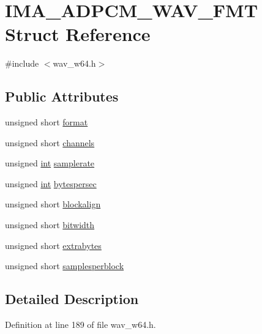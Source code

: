 \hypertarget{struct_i_m_a___a_d_p_c_m___w_a_v___f_m_t}{}\section{I\+M\+A\+\_\+\+A\+D\+P\+C\+M\+\_\+\+W\+A\+V\+\_\+\+F\+MT Struct Reference}
\label{struct_i_m_a___a_d_p_c_m___w_a_v___f_m_t}


{\ttfamily \#include $<$wav\+\_\+w64.\+h$>$}

\subsection*{Public Attributes}
\begin{DoxyCompactItemize}
\item 
unsigned short \hyperlink{struct_i_m_a___a_d_p_c_m___w_a_v___f_m_t_aa33b040c885f3c536a1dd34a5917cb38}{format}
\item 
unsigned short \hyperlink{struct_i_m_a___a_d_p_c_m___w_a_v___f_m_t_a302decd1d4bb70e338bfef02e4a65845}{channels}
\item 
unsigned \hyperlink{xmltok_8h_a5a0d4a5641ce434f1d23533f2b2e6653}{int} \hyperlink{struct_i_m_a___a_d_p_c_m___w_a_v___f_m_t_a65cfee0844b5d6a9db8b479eeb32e649}{samplerate}
\item 
unsigned \hyperlink{xmltok_8h_a5a0d4a5641ce434f1d23533f2b2e6653}{int} \hyperlink{struct_i_m_a___a_d_p_c_m___w_a_v___f_m_t_a2a14a06ba191178dfc4f69c7568ae2a6}{bytespersec}
\item 
unsigned short \hyperlink{struct_i_m_a___a_d_p_c_m___w_a_v___f_m_t_a6825977def909303f455591eba87accc}{blockalign}
\item 
unsigned short \hyperlink{struct_i_m_a___a_d_p_c_m___w_a_v___f_m_t_ad72c9fb895e367087e0361d8d7f246b8}{bitwidth}
\item 
unsigned short \hyperlink{struct_i_m_a___a_d_p_c_m___w_a_v___f_m_t_a155eb8cdf1fb8e65d693fcdfa011861e}{extrabytes}
\item 
unsigned short \hyperlink{struct_i_m_a___a_d_p_c_m___w_a_v___f_m_t_ac9f167c103fa30ec8bf5827433edb90e}{samplesperblock}
\end{DoxyCompactItemize}


\subsection{Detailed Description}


Definition at line 189 of file wav\+\_\+w64.\+h.




